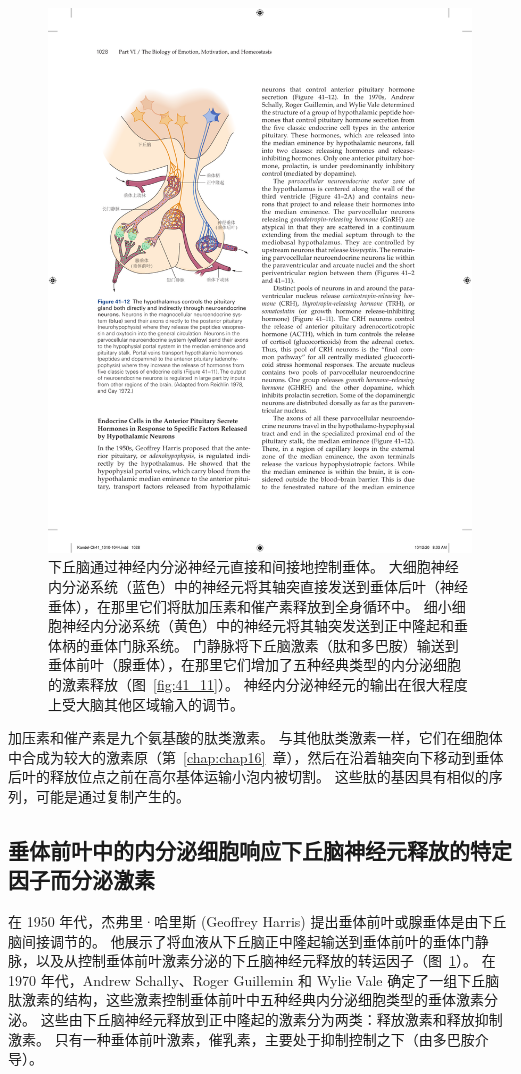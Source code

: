 \begin{figure}[htbp]
	\centering
	\includegraphics[width=0.5\linewidth]{chap41/fig_41_12}
	\caption{下丘脑通过神经内分泌神经元直接和间接地控制垂体。
		大细胞神经内分泌系统（蓝色）中的神经元将其轴突直接发送到垂体后叶（神经垂体），在那里它们将肽加压素和催产素释放到全身循环中。
		细小细胞神经内分泌系统（黄色）中的神经元将其轴突发送到正中隆起和垂体柄的垂体门脉系统。
		门静脉将下丘脑激素（肽和多巴胺）输送到垂体前叶（腺垂体），在那里它们增加了五种经典类型的内分泌细胞的激素释放（图~\ref{fig:41_11}）。
		神经内分泌神经元的输出在很大程度上受大脑其他区域输入的调节。}
	\label{fig:41_12}
\end{figure}


加压素和催产素是九个氨基酸的肽类激素。
与其他肽类激素一样，它们在细胞体中合成为较大的激素原（第~\ref{chap:chap16}~章），然后在沿着轴突向下移动到垂体后叶的释放位点之前在高尔基体运输小泡内被切割。
这些肽的基因具有相似的序列，可能是通过复制产生的。



\subsection{垂体前叶中的内分泌细胞响应下丘脑神经元释放的特定因子而分泌激素}

在 1950 年代，杰弗里·哈里斯 (Geoffrey Harris) 提出垂体前叶或腺垂体是由下丘脑间接调节的。
他展示了将血液从下丘脑正中隆起输送到垂体前叶的垂体门静脉，以及从控制垂体前叶激素分泌的下丘脑神经元释放的转运因子（图~\ref{fig:41_12}）。
在 1970 年代，Andrew Schally、Roger Guillemin 和 Wylie Vale 确定了一组下丘脑肽激素的结构，这些激素控制垂体前叶中五种经典内分泌细胞类型的垂体激素分泌。
这些由下丘脑神经元释放到正中隆起的激素分为两类：释放激素和释放抑制激素。
只有一种垂体前叶激素，催乳素，主要处于抑制控制之下（由多巴胺介导）。



